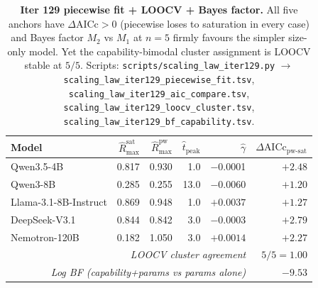 \begin{table}[t]
  \centering
  \small
  \begin{tabular}{lrrrrr}
    \toprule
    Model & $\hat R_{\max}^{\text{sat}}$ &
           $\hat R_{\max}^{\text{pw}}$ &
           $\hat t_\mathrm{peak}$ & $\hat\gamma$ &
           $\Delta\text{AICc}_\text{pw-sat}$ \\
    \midrule
    Qwen3.5-4B             & 0.817 & 0.930 & 1.0 & $-$0.0001 & $+2.48$ \\
    Qwen3-8B               & 0.285 & 0.255 & 13.0 & $-$0.0060 & $+1.20$ \\
    Llama-3.1-8B-Instruct  & 0.869 & 0.948 & 1.0 & $+0.0037$ & $+1.27$ \\
    DeepSeek-V3.1          & 0.844 & 0.842 & 3.0 & $-$0.0003 & $+2.79$ \\
    Nemotron-120B          & 0.182 & 1.050 & 3.0 & $+0.0014$ & $+2.27$ \\
    \midrule
    \multicolumn{5}{r}{\emph{LOOCV cluster agreement}} & $5/5 = 1.00$ \\
    \multicolumn{5}{r}{\emph{Log BF (capability+params vs params alone)}} & $-9.53$ \\
    \bottomrule
  \end{tabular}
  \caption{\textbf{Iter 129 piecewise fit + LOOCV + Bayes factor.}
    All five anchors have $\Delta\text{AICc} > 0$
    (piecewise loses to saturation in every case) and Bayes factor
    $M_2$ vs $M_1$ at $n=5$ firmly favours the simpler size-only
    model.  Yet the capability-bimodal cluster assignment is LOOCV
    stable at $5/5$.  Scripts:
    \texttt{scripts/scaling\_law\_iter129.py} $\to$
    \texttt{scaling\_law\_iter129\_piecewise\_fit.tsv},
    \texttt{scaling\_law\_iter129\_aic\_compare.tsv},
    \texttt{scaling\_law\_iter129\_loocv\_cluster.tsv},
    \texttt{scaling\_law\_iter129\_bf\_capability.tsv}.}
  \label{tab:scaling-iter129-fit}
\end{table}

